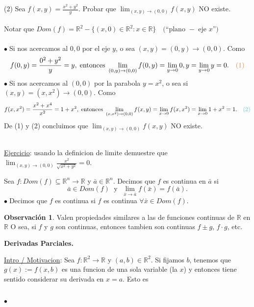 \documentclass{article}
\theoremstyle{definition}
\theoremstyle{definition}
\newtheorem*{obs}{Observación}
\theoremstyle{remark}
\newcommand\bl{$\bullet\;$}
\begin{document}
\pagebreak 
\textcolor{verdep2}{(2)} Sea $f(x,y)=\frac{x^2+y^2}{y}$. Probar que $\lim_{(x,y)\to(0,0)}{f(x,y)}$ NO existe.
\\\\ 
Notar que $Dom(f)=\mathbb{R}^2-\big\{(x,0) \in \mathbb{R}^2 : x \in \mathbb{R}\big\} \quad \big(\text{``plano }- \text{ eje }x \text{''}\big)$ \\\\ 
\bl Si nos acercamos al $0,0$ por el eje $y$, o sea $(x,y)=(0,y) \to (0,0)$. Como \[
  f(0,y)=\frac{0^2+y^2}{y}=y, \; \text{entonces } \lim_{(0,y) \to (0,0)}{f(0,y)}=\lim_{y \to 0}{0,y}=\lim_{y \to 0}{y}=0. \quad \textcolor{rojop2}{\text{(1)}}
\]
\bl Si nos acercamos al $(0,0)$ por la parabola $y=x^2$, o sea si \mbox{$(x,y)=(x,x^2) \to (0,0)\text{. Como }$}\[
  f(x,x^2)=\frac{x^2+x^4}{x^2}=1+x^2, \; \text{entonces } \lim_{(x,x^2)\to(0,0)}{f(x,y)}=\lim_{x\to0}{f(x,x^2)}=\lim_{x\to 0}{1+x^2}=1. \quad \textcolor{verdep2}{\text(2)}
\]
De \textcolor{rojop2}{(1)} y \textcolor{verdep2}{(2)} concluimos que $\lim_{(x,y)\to(0,0)}{f(x,y)}$ NO existe.
\begin{figure}[h]
\centering
\def\svgwidth{0.35\textwidth}

\end{figure}\\
\underline{Ejercicio}: usando la definicion de limite demuestre que \mbox{$\lim_{(x,y)\to(0,0)}{\frac{x^2}{\sqrt{x^2+y^2}}}=0$.} 
\begin{defi}[Continuidad] Sea $f : Dom(f) \subseteq \mathbb{R}^n \to \mathbb{R}$ y $\bar{a} \in \mathbb{R}^n$. Decimos que $f$ es continua en $\bar{a}$ si $$\bar{a} \in Dom(f) \; \text{ y } \; \lim_{\bar{x} \to \bar{a}}{f(\bar{x})}=f(\bar{a}).$$
  \bl Decimos que $f$ es continua si $f$ es continua $\forall \bar{x} \in Dom(f)$. 
\end{defi}
\begin{obs}
  Valen propiedades similares a las de funciones continuas de $\mathbb{R}$ en $\mathbb{R}$ O sea, si $f$ y $g$ son continuas, entonces tambien son continuas $f \pm g$, $f \cdot g$, etc.
\end{obs}
\pagebreak
\begin{center}
\textbf{Derivadas Parciales.}
\end{center}
\underline{Intro / Motivacion}: Sea $f : \mathbb{R}^2 \to \mathbb{R}$ y $(a,b) \in \mathbb{R}^2$. Si fijamos $b$, tenemos que $g(x):=f(x,b)$ es una funcion de una sola variable (la $x$) y entonces tiene sentido considerar su derivada en $x=a$. Esto es 
\begin{figure}[h]
\centering
\def\svgwidth{1\textwidth}

\end{figure} \; \\ \bl 
\end{document}
